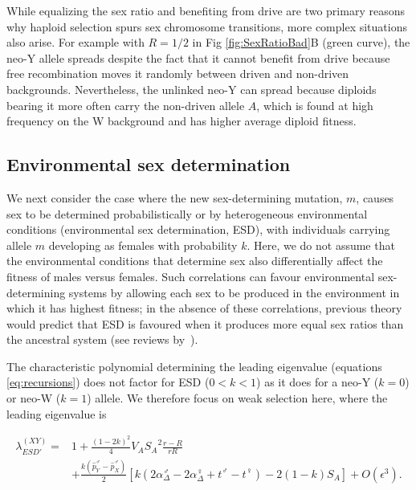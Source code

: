 \documentclass[10pt,letterpaper]{article}
\providecommand{\DIFaddtex}[1]{{\protect\color{blue}\uwave{#1}}} %
\providecommand{\DIFaddbegin}{} %
\providecommand{\DIFaddend}{} %
\providecommand{\DIFadd}[1]{\texorpdfstring{\DIFaddtex{#1}}{#1}} %
\newcommand{\DIFaddincludegraphics}[2][]{{\color{blue}\fbox{\DIFOincludegraphics[#1]{#2}}}} %
\DeclareRobustCommand{\DIFaddbegin}{\DIFOaddbegin \let\includegraphics\DIFaddincludegraphics} %
\DeclareRobustCommand{\DIFaddend}{\DIFOaddend \let\includegraphics\DIFOincludegraphics} %
\begin{document}
While equalizing the sex ratio and benefiting from drive are two primary reasons why haploid selection spurs sex chromosome transitions, more complex situations also arise.  
For example with $R=1/2$ in Fig \ref{fig:SexRatioBad}B (green curve), the neo-Y allele spreads despite the fact that it cannot benefit from drive because free recombination moves it randomly between driven and non-driven backgrounds.  
Nevertheless, the unlinked neo-Y can spread because diploids bearing it more often carry the non-driven allele $A$, which is found at high frequency on the W background and has higher average diploid fitness.%

\subsection*{Environmental sex determination}

We next consider the case where the new sex-determining mutation, $m$, causes sex to be determined probabilistically or by heterogeneous environmental conditions (environmental sex determination, ESD), with individuals carrying allele $m$ developing as females with probability $k$.
\DIFaddbegin \DIFadd{\textcolor{red}{In our deterministic model this means the fraction female is exactly $k$, even when $m$ is rare (exploring the effect of the variance induced by ESD would also be interesting).}
}\DIFaddend Here, we do not assume that the environmental conditions that determine sex also differentially affect the fitness of males versus females. 
Such correlations can favour environmental sex-determining systems by allowing each sex to be produced in the environment in which it has highest fitness; in the absence of these correlations, previous theory would predict that ESD is favoured when it produces more equal sex ratios than the ancestral system (see reviews by~\cite{Charnov:1982wg,Bull:1983vi,West:2009we}). %

The characteristic polynomial determining the leading eigenvalue (equations \ref{eq:recursions}) does not factor for ESD ($0<k<1$) as it does for a neo-Y ($k=0$) or neo-W ($k=1$) allele. 
We therefore focus on weak selection here, where the leading eigenvalue is

\begin{equation}
\begin{split}
\lambda_{ESD'}^{(XY)} =& 1 + \frac{{(1-2k)}^2}{4}V_{A}{S_{A}}^2\frac{r-R}{r R} \\
&+\frac{k(\hat{p}^\male_Y-\hat{p}^\male_X)}{2}\left[ k \left(2\alpha_{\Delta}^\male-2\alpha_{\Delta}^\female+t^\male-t^\female \right) -2(1-k)S_{A}\right]+O\left(\epsilon^3\right).
\end{split}
\label{eq:lambda_ESD_k}
\end{equation}
\end{document}
